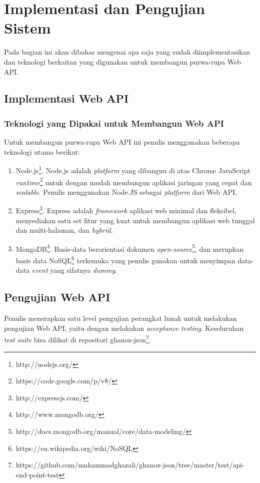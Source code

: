 \documentclass[a4paper, 12pt, oneside]{report}
\begin{document}
\chapter{Implementasi dan Pengujian Sistem} \label{bab:5}

\onehalfspacing Pada bagian ini akan dibahas mengenai apa saja yang sudah diimplementasikan dan teknologi berkaitan yang digunakan untuk membangun purwa-rupa Web API.

\section{Implementasi Web API}

\subsection{Teknologi yang Dipakai untuk Membangun Web API}

\onehalfspacing Untuk membangun purwa-rupa Web API ini penulis menggunakan beberapa teknologi utama berikut:

\begin{enumerate}
  \item Node.js\footnote{http://nodejs.org/}. Node.js adalah \textit{platform} yang dibangun di atas Chrome JavaScript \textit{runtime}\footnote{https://code.google.com/p/v8/} untuk dengan mudah membangun aplikasi jaringan yang cepat dan \textit{scalable}. Penulis menggunakan Node.JS sebagai \textit{platform} dari Web API.
  \item Express\footnote{http://expressjs.com/}. Express adalah \textit{framework} aplikasi web minimal dan fleksibel, menyediakan satu set fitur yang kuat untuk membangun aplikasi web tunggal dan multi-halaman, dan \textit{hybrid}.
  \item MongoDB\footnote{http://www.mongodb.org/}. Basis-data berorientasi dokumen \textit{open-source}\footnote{http://docs.mongodb.org/manual/core/data-modeling/}, dan merupkan basis data NoSQL\footnote{https://en.wikipedia.org/wiki/NoSQL} terkemuka yang penulis gunakan untuk menyimpan data-data \textit{event} yang sifatnya \textit{dummy}.
\end{enumerate}

\section{Pengujian Web API}

Penulis menerapkan satu level pengujian perangkat lunak untuk melakukan pengujian Web API, yaitu dengan melakukan \textit{acceptance testing}. Keseluruhan \textit{test suite} bisa dilihat di repositori ghanoz-json\footnote{https://github.com/muhammadghazali/ghanoz-json/tree/master/test/api-end-point-test}.
\end{document}
